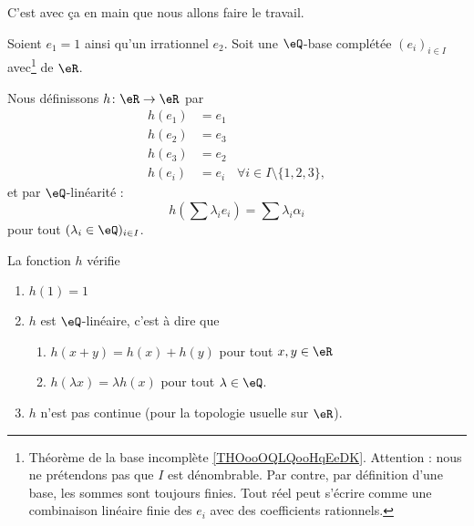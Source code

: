 C'est avec ça en main que nous allons faire le travail.

\begin{proposition}
    Soient \( e_1=1\) ainsi qu'un irrationnel \( e_2\). Soit une \( \eQ\)-base complétée \( (e_i)_{i\in I}\) avec\footnote{Théorème de la base incomplète \ref{THOooOQLQooHqEeDK}. Attention : nous ne prétendons pas que \( I\) est dénombrable. Par contre, par définition d'une base, les sommes sont toujours finies. Tout réel peut s'écrire comme une combinaison linéaire finie des \( e_i\) avec des coefficients rationnels.} de \( \eR\).

    Nous définissons \( h\colon \eR\to \eR\) par
    \begin{subequations}
        \begin{align}
            h(e_1)&=e_1\\
            h(e_2)&=e_3\\
            h(e_3)&=e_2\\
            h(e_i)&=e_i &  \forall i\in I\setminus\{ 1,2,3 \},
        \end{align}
    \end{subequations}
    et par \( \eQ\)-linéarité :
    \begin{equation}
        	h(\sum \lambda_i e_i) = \sum \lambda_i \alpha_i
    \end{equation}
    pour tout \( (\lambda_i\in \eQ)_{i\in I}\).

    La fonction \( h\) vérifie
    \begin{enumerate}
        \item       \label{ITEMooOXXMooJFSuuN}
            \( h(1)=1\)
        \item
            \( h\) est \( \eQ\)-linéaire, c'est à dire que
            \begin{enumerate}
                \item   \label{ITEMooAVNMooEsodLR}
            \( h(x+y)=h(x)+h(y)\) pour tout \( x,y\in \eR\)
        \item       \label{ITEMooDEJMooXtvrgi}
            \( h(\lambda x)=\lambda h(x)\) pour tout \( \lambda\in \eQ\).
            \end{enumerate}
        \item       \label{ITEMooMHNZooBHQywD}
            \( h\) n'est pas continue (pour la topologie usuelle sur \( \eR\)).
    \end{enumerate}
\end{proposition}

